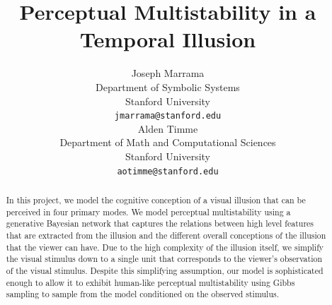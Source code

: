 \documentclass{article} %
\title{Perceptual Multistability in a Temporal Illusion}
\author{
Joseph Marrama \\
Department of Symbolic Systems\\
Stanford University\\
\texttt{jmarrama@stanford.edu} \\
\And
Alden Timme \\
Department of Math and Computational Sciences \\
Stanford University \\
\texttt{aotimme@stanford.edu} \\
}
\begin{document}
\maketitle

\begin{abstract}
In this project, we model the cognitive conception of a visual illusion that can be perceived in four primary modes. 
We model perceptual multistability using a generative Bayesian network that captures the relations between high level features that are extracted from the illusion and the different overall conceptions of the illusion that the viewer can have.
Due to the high complexity of the illusion itself, we simplify the visual stimulus down to a single unit that corresponds to the viewer's observation of the visual stimulus.
Despite this simplifying assumption, our model is sophisticated enough to allow it to exhibit human-like perceptual multistability using Gibbs sampling to sample from the model conditioned on the observed stimulus. 


\end{abstract}




\end{document}

